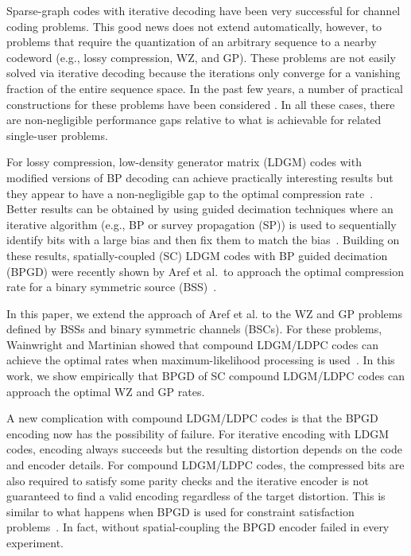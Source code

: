 
Sparse-graph codes with iterative decoding have been very successful for channel coding problems.
This good news does not extend automatically, however, to problems that require the quantization of an arbitrary sequence to a nearby codeword (e.g., lossy compression, WZ, and GP).
These problems are not easily solved via iterative decoding because the iterations only converge for a vanishing fraction of the entire sequence space.
In the past few years, a number of practical constructions for these problems have been considered \cite{Yang-asilomar03,Liveris-icip03,Erez-it05,Sun-it09}.
In all these cases, there are non-negligible performance gaps relative to what is achievable for related single-user problems. 

For lossy compression, low-density generator matrix (LDGM) codes with modified versions of BP decoding can achieve practically interesting results but they appear to have a non-negligible gap to the optimal compression rate~\cite{Murayama-physreve04,Regalia-com09}.
Better results can be obtained by using guided decimation techniques where an iterative algorithm (e.g., BP or survey propagation (SP)) is used to sequentially identify bits with a large bias and then fix them to match the bias~\cite{Ciliberti-physrevlet05,Wainwright-it10}.
Building on these results, spatially-coupled (SC) LDGM codes with BP guided decimation (BPGD) were recently shown by Aref et al.~to approach the optimal compression rate for a binary symmetric source (BSS)~\cite{Aref-isit12,Aref-arxiv13}.

In this paper, we extend the approach of Aref et al. to the WZ and GP problems defined by BSSs and binary symmetric channels (BSCs).
For these problems, Wainwright and Martinian showed that compound LDGM/LDPC codes can achieve the optimal rates when maximum-likelihood processing is used~\cite{Wainwright-it09}. In this work, we show empirically that BPGD of SC compound LDGM/LDPC codes can approach the optimal WZ and GP rates.

A new complication with compound LDGM/LDPC codes is that the BPGD encoding now has the possibility of failure.
For iterative encoding with LDGM codes, encoding always succeeds but the resulting distortion depends on the code and encoder details.
For compound LDGM/LDPC codes, the compressed bits are also required to satisfy some parity checks and the iterative encoder is not guaranteed to find a valid encoding regardless of the target distortion.
This is similar to what happens when BPGD is used for constraint satisfaction problems~\cite{Montanari-arxiv07a}.
In fact, without spatial-coupling the BPGD encoder failed in every experiment.

